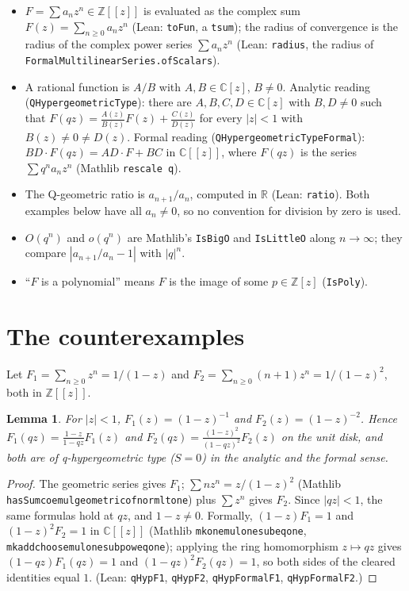 \documentclass[11pt]{article}
\newtheorem{lemma}[theorem]{Lemma}
\theoremstyle{definition}
\theoremstyle{remark}
\renewcommand{\_}{\oldus\allowbreak}
\begin{document}
\begin{itemize}
  \item $F=\sum a_nz^n\in\mathbb Z[[z]]$ is evaluated as the complex sum $F(z)=\sum_{n\ge0}a_nz^n$
        (Lean: \texttt{toFun}, a \texttt{tsum}); the radius of convergence is the radius of the complex
        power series $\sum a_nz^n$ (Lean: \texttt{radius}, the radius of
        \texttt{FormalMultilinearSeries.ofScalars}).
  \item A rational function is $A/B$ with $A,B\in\mathbb C[z]$, $B\ne0$. Analytic reading
        (\texttt{QHypergeometricType}): there are $A,B,C,D\in\mathbb C[z]$ with $B,D\ne0$ such that
        $F(qz)=\frac{A(z)}{B(z)}F(z)+\frac{C(z)}{D(z)}$ for every $|z|<1$ with $B(z)\ne0\ne D(z)$.
        Formal reading (\texttt{QHypergeometricTypeFormal}): $BD\cdot F(qz)=AD\cdot F+BC$ in
        $\mathbb C[[z]]$, where $F(qz)$ is the series $\sum q^na_nz^n$ (Mathlib \texttt{rescale q}).
  \item The Q-geometric ratio is $a_{n+1}/a_n$, computed in $\mathbb R$ (Lean: \texttt{ratio}). Both
        examples below have all $a_n\neq0$, so no convention for division by zero is used.
  \item $O(q^n)$ and $o(q^n)$ are Mathlib's \texttt{IsBigO} and \texttt{IsLittleO} along
        $n\to\infty$; they compare $|a_{n+1}/a_n-1|$ with $|q|^n$.
  \item ``$F$ is a polynomial'' means $F$ is the image of some $p\in\mathbb Z[z]$ (\texttt{IsPoly}).
\end{itemize}

\section{The counterexamples}

Let $F_1=\sum_{n\ge0}z^n=1/(1-z)$ and $F_2=\sum_{n\ge0}(n+1)z^n=1/(1-z)^2$, both in $\mathbb Z[[z]]$.

\begin{lemma}\label{lem:qhyp}
For $|z|<1$, $F_1(z)=(1-z)^{-1}$ and $F_2(z)=(1-z)^{-2}$. Hence
$F_1(qz)=\frac{1-z}{1-qz}F_1(z)$ and $F_2(qz)=\frac{(1-z)^2}{(1-qz)^2}F_2(z)$ on the unit disk, and
both are of q-hypergeometric type ($S=0$) in the analytic and the formal sense.
\end{lemma}
\begin{proof}
The geometric series gives $F_1$; $\sum nz^n=z/(1-z)^2$ (Mathlib
\texttt{hasSum\_coe\_mul\_geometric\_of\_norm\_lt\_one}) plus $\sum z^n$ gives $F_2$. Since $|qz|<1$,
the same formulas hold at $qz$, and $1-z\ne0$. Formally, $(1-z)F_1=1$ and $(1-z)^2F_2=1$ in
$\mathbb C[[z]]$ (Mathlib \texttt{mk\_one\_mul\_one\_sub\_eq\_one},
\texttt{mk\_add\_choose\_mul\_one\_sub\_pow\_eq\_one}); applying the ring homomorphism
$z\mapsto qz$ gives $(1-qz)F_1(qz)=1$ and $(1-qz)^2F_2(qz)=1$, so both sides of the cleared identities equal
$1$. (Lean: \texttt{qHyp\_F1}, \texttt{qHyp\_F2}, \texttt{qHypFormal\_F1}, \texttt{qHypFormal\_F2}.)
\end{proof}
\end{document}
